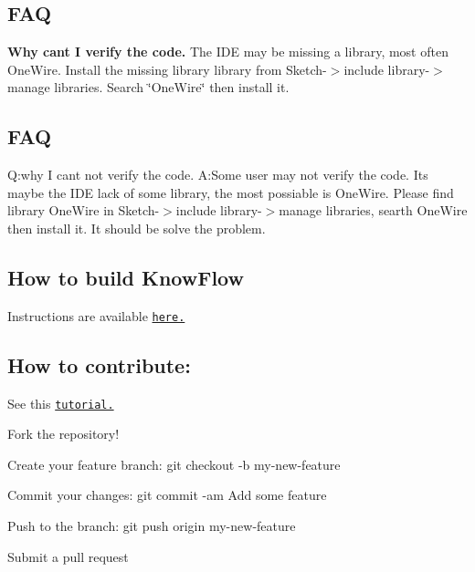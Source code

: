 \subsection*{F\+AQ}

{\bfseries Why can\textquotesingle{}t I verify the code.} The I\+DE may be missing a library, most often One\+Wire. Install the missing library library from Sketch-\/$>$include library-\/$>$manage libraries. Search \char`\"{}\+One\+Wire\char`\"{} then install it.

\subsection*{F\+AQ}


\begin{DoxyEnumerate}
\item Q\+:why I can\textquotesingle{}t not verify the code. A\+:Some user may not verify the code. It\textquotesingle{}s maybe the I\+DE lack of some library, the most possiable is One\+Wire. Please find library One\+Wire in Sketch-\/$>$include library-\/$>$manage libraries, searth One\+Wire then install it. It should be solve the problem.
\end{DoxyEnumerate}

\subsection*{How to build Know\+Flow}

Instructions are available \href{https://publiclab.org/notes/shanlter/06-08-2017/knowflow-automatic-water-meter}{\tt here.}

\subsection*{How to contribute\+:}

See this \href{https://help.github.com/articles/creating-a-pull-request/}{\tt tutorial.}
\begin{DoxyEnumerate}
\item Fork the repository!
\end{DoxyEnumerate}
\begin{DoxyEnumerate}
\item Create your feature branch\+: git checkout -\/b my-\/new-\/feature
\end{DoxyEnumerate}
\begin{DoxyEnumerate}
\item Commit your changes\+: git commit -\/am \textquotesingle{}Add some feature\textquotesingle{}
\end{DoxyEnumerate}
\begin{DoxyEnumerate}
\item Push to the branch\+: git push origin my-\/new-\/feature
\end{DoxyEnumerate}
\begin{DoxyEnumerate}
\item Submit a pull request
\end{DoxyEnumerate}

